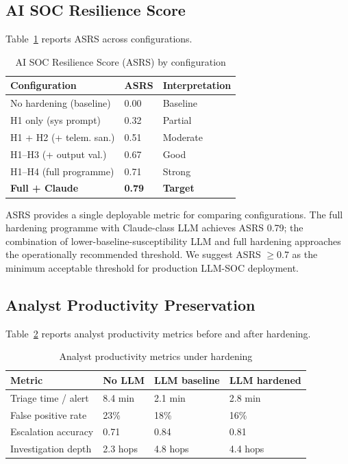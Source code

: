 \documentclass[sigconf,nonacm]{acmart}
\begin{document}
\subsection{AI SOC Resilience Score}

Table~\ref{tab:asrs} reports ASRS across configurations.

\begin{table}[h]
\caption{AI SOC Resilience Score (ASRS) by configuration}
\label{tab:asrs}
\small
\begin{tabularx}{\columnwidth}{@{}p{3.4cm}X X@{}}
\toprule
\textbf{Configuration} & \textbf{ASRS} & \textbf{Interpretation} \\
\midrule
No hardening (baseline)  & 0.00 & Baseline \\
H1 only (sys prompt)     & 0.32 & Partial \\
H1 + H2 (+ telem. san.) & 0.51 & Moderate \\
H1--H3 (+ output val.)  & 0.67 & Good \\
H1--H4 (full programme) & 0.71 & Strong \\
\midrule
\textbf{Full + Claude}   & \textbf{0.79} & \textbf{Target} \\
\bottomrule
\end{tabularx}
\end{table}

ASRS provides a single deployable metric for comparing
configurations. The full hardening programme with Claude-class
LLM achieves ASRS 0.79; the combination of
lower-baseline-susceptibility LLM and full hardening approaches
the operationally recommended threshold. We suggest ASRS
$\geq 0.7$ as the minimum acceptable threshold for production
LLM-SOC deployment.

\subsection{Analyst Productivity Preservation}

Table~\ref{tab:productivity} reports analyst productivity
metrics before and after hardening.

\begin{table}[h]
\caption{Analyst productivity metrics under hardening}
\label{tab:productivity}
\small
\begin{tabularx}{\columnwidth}{@{}p{2.8cm}X X X@{}}
\toprule
\textbf{Metric} & \textbf{No LLM} & \textbf{LLM baseline} & \textbf{LLM hardened} \\
\midrule
Triage time / alert & 8.4 min & 2.1 min & 2.8 min \\
False positive rate & 23\% & 18\% & 16\% \\
Escalation accuracy & 0.71 & 0.84 & 0.81 \\
Investigation depth  & 2.3 hops & 4.8 hops & 4.4 hops \\
\bottomrule
\end{tabularx}
\end{table}
\end{document}
